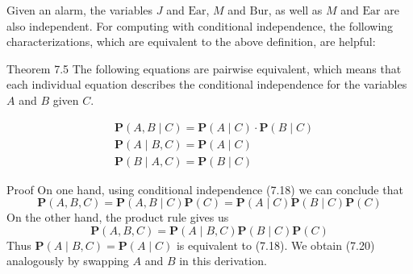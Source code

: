 \documentclass[10pt]{book}
\begin{document}
Given an alarm, the variables $J$ and $\text{Ear}$, $M$ and $\text{Bur}$, as well as $M$ and $\text{Ear}$ are also independent. For computing with conditional independence, the following characterizations, which are equivalent to the above definition, are helpful:

Theorem 7.5 The following equations are pairwise equivalent, which means that each individual equation describes the conditional independence for the variables $A$ and $B$ given $C$.

\begin{align*}
& \boldsymbol{P}(A, B \mid C)=\boldsymbol{P}(A \mid C) \cdot \boldsymbol{P}(B \mid C)  \tag{7.18}\\
& \boldsymbol{P}(A \mid B, C)=\boldsymbol{P}(A \mid C)  \tag{7.19}\\
& \boldsymbol{P}(B \mid A, C)=\boldsymbol{P}(B \mid C) \tag{7.20}
\end{align*}

Proof On one hand, using conditional independence (7.18) we can conclude that
$$
\boldsymbol{P}(A,B,C)=\boldsymbol{P}(A,B \mid C)\boldsymbol{P}(C)=\boldsymbol{P}(A \mid C)\boldsymbol{P}(B \mid C)\boldsymbol{P}(C)
$$
On the other hand, the product rule gives us
$$
\boldsymbol{P}(A,B,C)=\boldsymbol{P}(A \mid B,C)\boldsymbol{P}(B \mid C)\boldsymbol{P}(C)
$$
Thus $\boldsymbol{P}(A \mid B,C)=\boldsymbol{P}(A \mid C)$ is equivalent to (7.18). We obtain (7.20) analogously by swapping $A$ and $B$ in this derivation.
\end{document}
